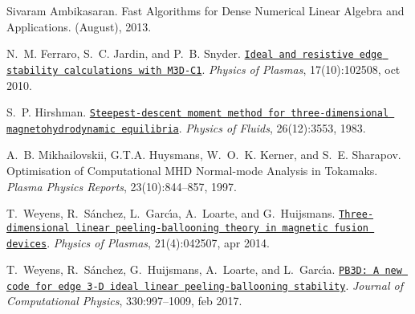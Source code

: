 
\begin{DoxyDescription}
\item[\label{_CITEREF_Ambikasaran2013}%
\mbox{[}1\mbox{]}]Sivaram Ambikasaran. Fast Algorithms for Dense Numerical Linear Algebra and Applications. (August), 2013.


\item[\label{_CITEREF_ferraro2010ELMbenchmark}%
\mbox{[}2\mbox{]}]N.~M. Ferraro, S.~C. Jardin, and P.~B. Snyder. \href{http://aip.scitation.org/doi/10.1063/1.3492727}{\tt Ideal and resistive edge stability calculations with M3\+D-\/\+C1}. {\itshape Physics of Plasmas}, 17(10)\+:102508, oct 2010. 


\item[\label{_CITEREF_hirshman1983vmec}%
\mbox{[}3\mbox{]}]S.~P. Hirshman. \href{http://scitation.aip.org/content/aip/journal/pof1/26/12/10.1063/1.864116}{\tt Steepest-\/descent moment method for three-\/dimensional magnetohydrodynamic equilibria}. {\itshape Physics of Fluids}, 26(12)\+:3553, 1983. 


\item[\label{_CITEREF_mikhailovskii1997optimization}%
\mbox{[}4\mbox{]}]A.~B. Mikhailovskii, G.\+T.\+A. Huysmans, W.~O.~K. Kerner, and S.~E. Sharapov. Optimisation of Computational M\+HD Normal-\/mode Analysis in Tokamaks. {\itshape Plasma Physics Reports}, 23(10)\+:844--857, 1997.


\item[\label{_CITEREF_weyens2014theory}%
\mbox{[}5\mbox{]}]T.~Weyens, R.~S\'{a}nchez, L.~Garc\'{\i}a, A.~Loarte, and G.~Huijsmans. \href{http://aip.scitation.org/doi/10.1063/1.4871859}{\tt Three-\/dimensional linear peeling-\/ballooning theory in magnetic fusion devices}. {\itshape Physics of Plasmas}, 21(4)\+:042507, apr 2014. 


\item[\label{_CITEREF_Weyens2017PB3D}%
\mbox{[}6\mbox{]}]T.~Weyens, R.~S\'{a}nchez, G.~Huijsmans, A.~Loarte, and L.~Garc\'{\i}a. \href{http://linkinghub.elsevier.com/retrieve/pii/S0021999116305629}{\tt P\+B3\+D\+: A new code for edge 3-\/D ideal linear peeling-\/ballooning stability}. {\itshape Journal of Computational Physics}, 330\+:997--1009, feb 2017. 


\end{DoxyDescription}